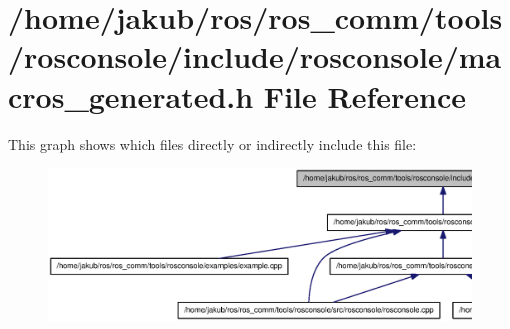 \section{/home/jakub/ros/ros\_\-comm/tools/rosconsole/include/rosconsole/macros\_\-generated.h File Reference}
\label{macros__generated_8h}
This graph shows which files directly or indirectly include this file:
\nopagebreak
\begin{figure}[H]
\begin{center}
\leavevmode
\includegraphics[width=400pt]{macros__generated_8h__dep__incl}
\end{center}
\end{figure}
